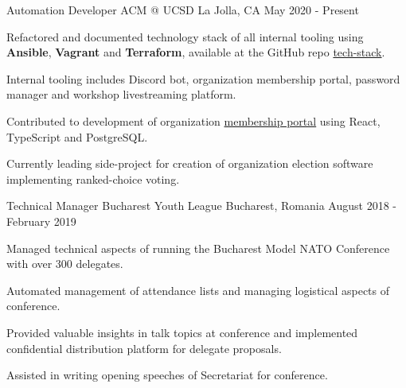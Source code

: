 
\begin{cventries}
  \cventry
    {Automation Developer}
    {ACM @ UCSD}
    {La Jolla, CA}
    {May 2020 - Present}
    {
      \begin{cvitems}
        \item {Refactored and documented technology stack of all internal tooling using \textbf{Ansible}, \textbf{Vagrant} and \textbf{Terraform}, available at the GitHub repo \href{https://github.com/acmucsd/tech-stack}{tech-stack}.}
        \item {Internal tooling includes Discord bot, organization membership portal, password manager and workshop livestreaming platform.}
        \item {Contributed to development of organization \href{https://github.com/acmucsd/membership-portal-ui}{membership portal} using React, TypeScript and PostgreSQL.}
        \item {Currently leading side-project for creation of organization election software implementing ranked-choice voting.}
      \end{cvitems}
    }
  \cventry
    {Technical Manager}
    {Bucharest Youth League}
    {Bucharest, Romania}
    {August 2018 - February 2019}
    {
      \begin{cvitems}
        \item {Managed technical aspects of running the Bucharest Model NATO Conference with over 300 delegates.}
        \item {Automated management of attendance lists and managing logistical aspects of conference.}
        \item {Provided valuable insights in talk topics at conference and implemented confidential distribution platform for delegate proposals.}
        \item {Assisted in writing opening speeches of Secretariat for conference.}
      \end{cvitems}
    }
\end{cventries}
